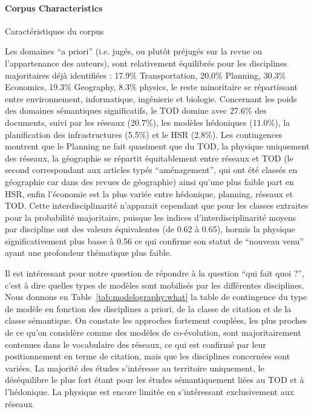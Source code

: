 \paragraph{Corpus Characteristics}{Caractéristiques du corpus}

%

Les domaines ``a priori'' (i.e. jugés, ou plutôt préjugés sur la revue ou l'appartenance des auteurs), sont relativement équilibrés pour les disciplines majoritaires déjà identifiées : 17.9\% Transportation, 20.0\% Planning, 30.3\% Economics, 19.3\% Geography, 8.3\% physics, le reste minoritaire se répartissant entre environnement, informatique, ingénierie et biologie. Concernant les poids des domaines sémantiques significatifs, le TOD domine avec 27.6\% des documents, suivi par les réseaux (20.7\%), les modèles hédoniques (11.0\%), la planification des infrastructures (5.5\%) et le HSR (2.8\%). Les contingences montrent que le Planning ne fait quasiment que du TOD, la physique uniquement des réseaux, la géographie se répartit équitablement entre réseaux et TOD (le second correspondant aux articles typés ``aménagement'', qui ont été classés en géographie car dans des revues de géographie) ainsi qu'une plus faible part en HSR, enfin l'économie est la plus variée entre hédonique, planning, réseaux et TOD. Cette interdisciplinarité n'apparait cependant que pour les classes extraites pour la probabilité majoritaire, puisque les indices d'interdisciplinarité moyens par discipline ont des valeurs équivalentes (de 0.62 à 0.65), hormis la physique significativement plus basse à 0.56 ce qui confirme son statut de ``nouveau venu'' ayant une profondeur thématique plus faible.


Il est intéressant pour notre question de répondre à la question ``qui fait quoi ?'', c'est à dire quelles types de modèles sont mobilisés par les différentes disciplines. Nous donnons en Table~\ref{tab:modelography:what} la table de contingence du type de modèle en fonction des disciplines a priori, de la classe de citation et de la classe sémantique. On constate les approches fortement couplées, les plus proches de ce qu'on considère comme des modèles de co-évolution, sont majoritairement contenues dans le vocabulaire des réseaux, ce qui est confirmé par leur positionnement en terme de citation, mais que les disciplines concernées sont variées. La majorité des études s'intéresse au territoire uniquement, le déséquilibre le plus fort étant pour les études sémantiquement liées au TOD et à l'hédonique. La physique est encore limitée en s'intéressant exclusivement aux réseaux. 



